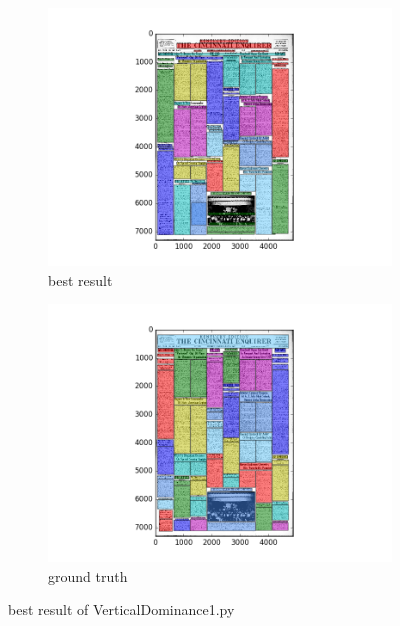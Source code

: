 \documentclass[a4paper,10pt]{article}
\begin{document}
					\begin{figure}
					\centering
					\begin{subfigure}{.5\textwidth}
					  \centering
					  \includegraphics[width=10cm]
					{VerticalDominance1.py.best.png}
					  \caption{best result}
					  \label{fig:sub1}
					\end{subfigure}%
					\begin{subfigure}{.5\textwidth}
					  \centering
					  \includegraphics[width=10cm]
					{VerticalDominance1.py.gt.best.png}
					  \caption{ground truth}
					  \label{fig:sub2}
					\end{subfigure}
					\caption
					{best result of VerticalDominance1.py}
					\label{fig:test}
					\end{figure}
						
\end{document}
